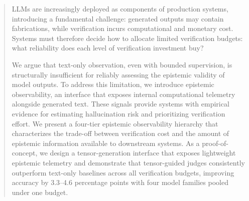 \begin{abstract}
    LLMs are increasingly deployed as components of production systems,
    introducing a fundamental challenge: generated outputs may contain fabrications,
    while verification incurs computational and monetary cost.
    Systems must therefore decide how to allocate limited verification budgets: 
    what reliability does each level of verification investment buy?
    
    We argue that text-only observation, even with bounded supervision, 
    is structurally insufficient for reliably assessing the epistemic validity of model outputs. 
    To address this limitation, we introduce epistemic observability,
    an interface that exposes internal computational telemetry alongside generated text.
    These signals provide systems with empirical evidence for estimating hallucination risk and prioritizing verification effort.
    We present a four-tier epistemic observability hierarchy that characterizes 
    the trade-off between verification cost and the amount of epistemic information available to downstream systems. 
    As a proof-of-concept, we design a tensor-generation interface that exposes lightweight epistemic telemetry and demonstrate that
    tensor-guided judges consistently outperform text-only baselines across all verification budgets,
    improving accuracy by 3.3--4.6 percentage points with four model families pooled under one budget.
    \end{abstract}
